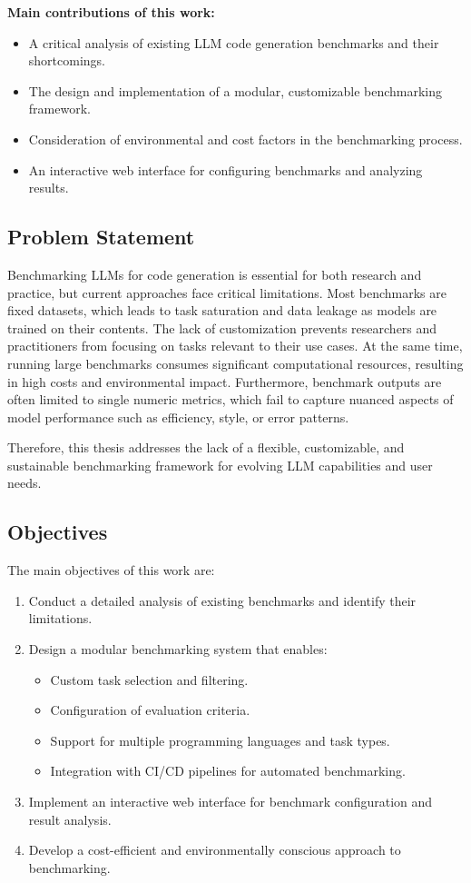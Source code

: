 \textbf{Main contributions of this work:}
\begin{itemize}
    \item A critical analysis of existing LLM code generation benchmarks and their shortcomings.
    \item The design and implementation of a modular, customizable benchmarking framework.
    \item Consideration of environmental and cost factors in the benchmarking process.
    \item An interactive web interface for configuring benchmarks and analyzing results.
\end{itemize}

\subsection{Problem Statement}

Benchmarking LLMs for code generation is essential for both research and practice, but current approaches face critical limitations.
Most benchmarks are fixed datasets, which leads to task saturation and data leakage as models are trained on their contents.
The lack of customization prevents researchers and practitioners from focusing on tasks relevant to their use cases.
At the same time, running large benchmarks consumes significant computational resources, resulting in high costs and environmental impact. Furthermore, benchmark outputs are often limited to single numeric metrics, which fail to capture nuanced aspects of model performance such as efficiency, style, or error patterns.

Therefore, this thesis addresses the lack of a flexible, customizable, and sustainable benchmarking framework for evolving LLM capabilities and user needs.

\subsection{Objectives}

The main objectives of this work are:
\begin{enumerate}
    \item Conduct a detailed analysis of existing benchmarks and identify their limitations.
    \item Design a modular benchmarking system that enables:
    \begin{itemize}
        \item Custom task selection and filtering.
        \item Configuration of evaluation criteria.
        \item Support for multiple programming languages and task types.
        \item Integration with CI/CD pipelines for automated benchmarking.
    \end{itemize}
    \item Implement an interactive web interface for benchmark configuration and result analysis.
    \item Develop a cost-efficient and environmentally conscious approach to benchmarking.
\end{enumerate}

